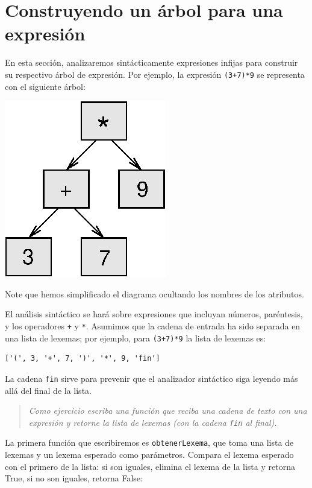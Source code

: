 \section{Construyendo un árbol para una expresión}

En esta sección, analizaremos sintácticamente expresiones
infijas para construir su respectivo árbol de expresión. Por
ejemplo, la expresión \texttt{(3+7)*9} se representa con 
el siguiente árbol:

\beforefig
\centerline{\includegraphics{illustrations/tree3.eps}}
\afterfig

Note que hemos simplificado el diagrama ocultando los 
nombres de los atributos.

El análisis sintáctico se hará sobre expresiones que incluyan
números, paréntesis, y los operadores \texttt{+} y \texttt{*}.
Asumimos que la cadena de entrada ha sido separada en una 
lista de lexemas; por ejemplo, para \texttt{(3+7)*9} la 
lista de lexemas es:

\beforeverb
\begin{verbatim}
['(', 3, '+', 7, ')', '*', 9, 'fin']
\end{verbatim}
\afterverb
%
La cadena \texttt{fin} sirve para prevenir que el analizador
sintáctico siga leyendo más allá del final de la lista.

\begin{quote}
{\em Como ejercicio escriba una función que reciba una cadena 
de texto con una expresión y retorne la lista de lexemas (con 
la cadena \texttt{fin} al final).}
\end{quote}

La primera función que escribiremos es \texttt{obtenerLexema}, que
toma una lista de lexemas y un lexema esperado como parámetros.  Compara
el lexema esperado con el primero de la lista: si son iguales, elimina
el lexema de la lista y retorna True, si no son iguales, retorna 
False:

